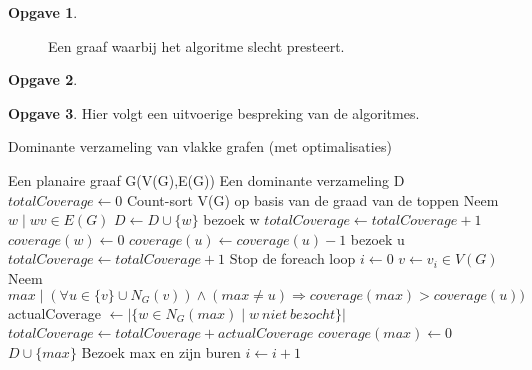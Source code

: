 \documentclass[11pt, a4paper, table]{article}
\makeatletter
\newenvironment{algoritme}[1][H]{%
	\renewcommand{\ALG@name}{Algoritme}%
	\renewcommand{\algorithmicrequire}{\textbf{Input:}}
	\renewcommand{\algorithmicensure}{\textbf{Output:}}
	\begin{algorithm}[#1]%
	}{\end{algorithm}}
\theoremstyle{definition}
\newtheorem{opgave}{Opgave}
\theoremstyle{definition}
\theoremstyle{definition}
\makeatother
\begin{document}
\begin{opgave}
\begin{figure}[H]
		\caption{Een graaf waarbij het algoritme slecht presteert.}
		\label{fig:worstcase}
	\end{figure}
\end{opgave}
\begin{opgave}
\end{opgave}
\begin{opgave}
		Hier volgt een uitvoerige bespreking van de algoritmes. 
		\begin{tcolorbox}[blanker,float=tbp, grow to left by=2cm,grow to right by=2cm]
		\begin{algoritme}
			\caption{Dominante verzameling van vlakke grafen (met optimalisaties)}
			\begin{algorithmic}[1]
				\Require Een planaire graaf G(V(G),E(G))
				\Ensure Een dominante verzameling D
				\State $totalCoverage \gets 0$
				\State Count-sort V(G) op basis van de graad van de toppen\label{sortoperation}
				\label{startoptimalizationloop1}
					\State Neem $w \mid wv \in E(G)$
						\State $D \gets D \cup \{w\}$
						\State bezoek w 
						\State $totalCoverage \gets totalCoverage+1$
						\State $coverage(w) \gets 0$
					\EndIf 
						\State $coverage(u) \gets coverage(u) - 1$
							\State bezoek u
							\State $totalCoverage \gets totalCoverage + 1 $
						\EndIf
					\EndFor
						\State Stop de foreach loop
					\EndIf 
				\EndFor\label{endoptimalizationloop1}
				 \label{startoptimalizationloop2}
					\State $i \gets 0$
					\label{startactualalgorithmloop}
					\State $v \gets v_i \in V(G)$
							\State Neem $max \mid (\forall u \in \{v\} \cup N_G(v)) \land (max \ne u) \Rightarrow coverage(max)>coverage(u))$
								\State actualCoverage $\gets \vert\{w \in N_G(max) \mid w\ niet \  bezocht\}\vert $ \label{neighbourloop2}
									\State $totalCoverage \gets totalCoverage + actualCoverage$
									\State $coverage(max)  \gets 0$
									\State $ D \cup \{max\}$
									\State Bezoek max en zijn buren\label{neighbourloop3}
								\EndIf 
							\EndIf
						\EndIf
						\State $i \gets i+1$
					\EndWhile\label{endactualalgorithmloop}
				\EndFor\label{endoptimalizationloop2}
				

\end{algorithmic}
\end{algoritme}
\end{tcolorbox}
\end{opgave}
\end{document}
